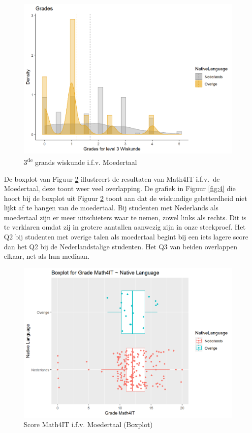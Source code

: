 \documentclass{hogent-article}
\begin{document}
\begin{figure}
\includegraphics[width=\linewidth]{Histogram-Niveau3Wiskunde-NativeLanguage.png}
\caption{\label{fig:2} 3\textsuperscript{de} graads wiskunde i.f.v. Moedertaal}
\end{figure}

De boxplot van Figuur \ref{fig:3} illustreert de resultaten van Math4IT i.f.v.\ de Moedertaal, deze toont weer veel overlapping. De grafiek in Figuur \ref{fig:4} die hoort bij de boxplot uit Figuur \ref{fig:3} toont aan dat de wiskundige geletterdheid niet lijkt af te hangen van de moedertaal. Bij studenten met Nederlands als moedertaal zijn er meer uitschieters waar te nemen, zowel links als rechts. Dit is te verklaren omdat zij in grotere aantallen aanwezig zijn in onze steekproef. Het Q2 bij studenten met overige talen als moedertaal begint bij een iets lagere score dan het Q2 bij de Nederlandstalige studenten. Het Q3 van beiden overlappen elkaar, net als hun mediaan.

\begin{figure}
\includegraphics[width=\linewidth]{Boxplot-GradeMath4IT-NativeLanguage.png}
\caption{\label{fig:3} Score Math4IT i.f.v. Moedertaal (Boxplot)}
\end{figure}
\end{document}
